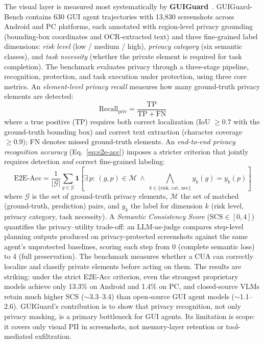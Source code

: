 The visual layer is measured most systematically by \textbf{GUIGuard}~\cite{guiguard2026}. GUIGuard-Bench contains 630 GUI agent trajectories with 13{,}830 screenshots across Android and PC platforms, each annotated with region-level privacy grounding (bounding-box coordinates and OCR-extracted text) and three fine-grained label dimensions: \emph{risk level} (low / medium / high), \emph{privacy category} (six semantic classes), and \emph{task necessity} (whether the private element is required for task completion). The benchmark evaluates privacy through a three-stage pipeline, recognition, protection, and task execution under protection, using three core metrics. An \emph{element-level privacy recall} measures how many ground-truth privacy elements are detected:
\begin{equation}
\mathrm{Recall}_{\mathrm{priv}} = \frac{\mathrm{TP}}{\mathrm{TP} + \mathrm{FN}}
\label{eq:priv-recall}
\end{equation}
where a true positive (TP) requires both correct localization (IoU $\geq 0.7$ with the ground-truth bounding box) and correct text extraction (character coverage $\geq 0.9$); FN denotes missed ground-truth elements. An \emph{end-to-end privacy recognition accuracy} (Eq.~\ref{eq:e2e-acc}) imposes a stricter criterion that jointly requires detection \emph{and} correct fine-grained labeling:
\begin{equation}
\mathrm{E2E\text{-}Acc} = \frac{1}{|\mathcal{G}|}\sum_{g\in\mathcal{G}}\mathbf{1}\!\left[\exists\,p:\,(g,p)\in\mathcal{M}\ \wedge\ \bigwedge_{k\in\{\mathrm{risk},\,\mathrm{cat},\,\mathrm{nec}\}} y_k(g)=y_k(p)\right]
\label{eq:e2e-acc}
\end{equation}
where $\mathcal{G}$ is the set of ground-truth privacy elements, $\mathcal{M}$ the set of matched (ground-truth, prediction) pairs, and $y_k$ the label for dimension $k$ (risk level, privacy category, task necessity). A \emph{Semantic Consistency Score} ($\mathrm{SCS}\in[0,4]$) quantifies the privacy--utility trade-off: an LLM-as-judge compares step-level planning outputs produced on privacy-protected screenshots against the same agent's unprotected baselines, scoring each step from 0 (complete semantic loss) to 4 (full preservation). The benchmark measures whether a CUA can correctly localize and classify private elements before acting on them. The results are striking: under the strict E2E-Acc criterion, even the strongest proprietary models achieve only 13.3\% on Android and 1.4\% on PC, and closed-source VLMs retain much higher SCS ($\sim$3.3--3.4) than open-source GUI agent models ($\sim$1.1--2.6). GUIGuard's contribution is to show that privacy recognition, not only privacy masking, is a primary bottleneck for GUI agents. Its limitation is scope: it covers only visual PII in screenshots, not memory-layer retention or tool-mediated exfiltration.

